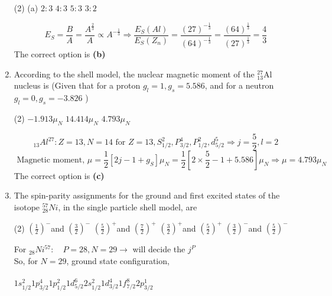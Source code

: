 \begin{enumerate}
{}
\begin{tasks}(2)
	\task[\textbf{A.}](a) $2: 3$
	\task[\textbf{B.}] $4: 3$
	\task[\textbf{C.}] $5: 3$
	\task[\textbf{D.}] $3: 2$
\end{tasks}
\begin{answer}
	$$E_{S}=\frac{B}{A}=\frac{A^{\frac{2}{3}}}{A} \propto A^{-\frac{1}{3}} \Rightarrow \frac{E_{S}(A l)}{E_{S}\left(Z_{n}\right)}=\frac{(27)^{-\frac{1}{3}}}{(64)^{-\frac{1}{3}}}=\frac{(64)^{\frac{1}{3}}}{(27)^{\frac{1}{3}}}=\frac{4}{3}$$
	The correct option is \textbf{(b)}
\end{answer}
\item According to the shell model, the nuclear magnetic moment of the ${ }_{13}^{27} \mathrm{Al}$ nucleus is (Given that for a proton $g_{l}=1, g_{s}=5.586$, and for a neutron $g_{l}=0, g_{s}=-3.826$ )
{}
\begin{tasks}(2)
	\task[\textbf{A.}] $-1.913 \mu_{N}$
	\task[\textbf{B.}]$14.414 \mu_{N}$
	\task[\textbf{C.}]$4.793 \mu_{N}$
\end{tasks}
\begin{answer}
$${ }_{13} A l^{27}: Z=13, N=14 \text { for } Z=13, S_{1 / 2}^{2}, P_{3 / 2}^{4}, P_{1 / 2}^{2}, d_{5 / 2}^{5} \Rightarrow j=\frac{5}{2}, l=2$$
$$
\text { Magnetic moment, } \mu=\frac{1}{2}\left[2 j-1+g_{S}\right] \mu_{N}=\frac{1}{2}\left[2 \times \frac{5}{2}-1+5.586\right] \mu_{N} \Rightarrow \mu=4.793 \mu_{N}
$$
The correct option is \textbf{(c)}	
\end{answer}
\item The spin-parity assignments for the ground and first excited states of the isotope ${ }_{28}^{57} N i$, in the single particle shell model, are
{}
\begin{tasks}(2)
	\task[\textbf{A.}] $\left(\frac{1}{2}\right)^{-}$and $\left(\frac{3}{2}\right)^{-}$
	\task[\textbf{B.}]$\left(\frac{5}{2}\right)^{+}$and $\left(\frac{7}{2}\right)^{+}$
	\task[\textbf{C.}]$\left(\frac{3}{2}\right)^{+}$and $\left(\frac{5}{2}\right)^{+}$
	\task[\textbf{D.}]$\left(\frac{3}{2}\right)^{-}$and $\left(\frac{5}{2}\right)^{-}$
\end{tasks}
\begin{answer}
	For ${ }_{28} N i^{57}: \quad P=28, N=29 \rightarrow$ will decide the $j^{P}$\\
	So, for $N=29$, ground state configuration,\\\\
	$1 s_{1 / 2}^{2} 1 p_{3 / 2}^{4} 1 p_{1 / 2}^{2} 1 d_{5 / 2}^{6} 2 s_{1 / 2}^{2} 1 d_{3 / 2}^{4} 1 f_{7 / 2}^{8} 2 p_{3 / 2}^{1}$\\\\

\end{answer}
\end{enumerate}
